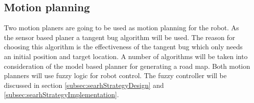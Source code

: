 \documentclass[../Head/Main.tex]{subfiles}
\begin{document}
\subsection{Motion planning}

Two motion planers are going to be used as motion planning for the robot. As the sensor based planer a tangent bug algorithm will be used. The reason for choosing this algorithm is the effectiveness of the tangent bug which only needs an initial position and target location. A number of algorithms will be taken into consideration of the model based planner for generating a road map. Both motion planners will use fuzzy logic for robot control. The fuzzy controller will be discussed in section \ref{subsec:searhStrategyDesign} and \ref{subsec:searhStrategyImplementation}.   



\end{document}
